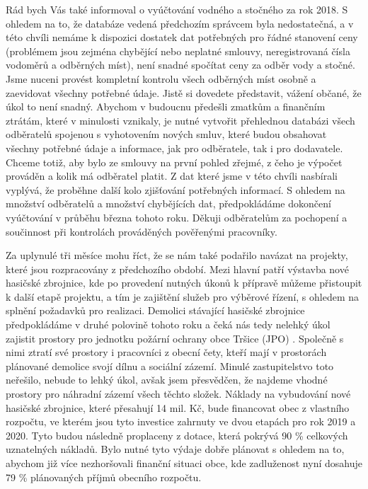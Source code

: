 \documentclass{article}
\begin{document}
\begin{multicols}{3}
{Rád bych Vás také informoval o vyúčtování vodného a stočného za rok 2018. S ohledem na to, že databáze vedená předchozím správcem byla nedostatečná, a v této chvíli nemáme k dispozici dostatek dat potřebných pro řádné stanovení ceny (problémem jsou zejména chybějící nebo neplatné smlouvy, neregistrovaná čísla vodoměrů a odběrných míst), není snadné spočítat ceny za odběr vody a stočné. Jsme nuceni provést kompletní kontrolu všech odběrných míst osobně a zaevidovat všechny potřebné údaje. Jistě si dovedete představit, vážení občané, že úkol to není snadný. Abychom v budoucnu předešli zmatkům a finančním ztrátám, které v minulosti vznikaly, je nutné vytvořit přehlednou databázi všech odběratelů spojenou s vyhotovením nových smluv, které budou obsahovat všechny potřebné údaje a informace, jak pro odběratele, tak i pro dodavatele. Chceme totiž, aby bylo ze smlouvy na první pohled zřejmé, z čeho je výpočet prováděn a kolik má odběratel platit. Z dat které jsme v této chvíli nasbírali vyplývá, že proběhne další kolo zjišťování potřebných informací. S ohledem na množství odběratelů a množství chybějících dat, předpokládáme dokončení vyúčtování v průběhu března tohoto roku. Děkuji odběratelům za pochopení a součinnost při kontrolách prováděných pověřenými pracovníky.

Za uplynulé tři měsíce mohu říct, že se nám také podařilo navázat na projekty, které jsou rozpracovány z předchozího období. Mezi hlavní patří výstavba nové hasičské zbrojnice, kde po provedení nutných úkonů k přípravě můžeme přistoupit k další etapě projektu, a tím je zajištění služeb pro výběrové řízení, s ohledem na splnění požadavků pro realizaci. Demolici stávající hasičské zbrojnice předpokládáme v druhé polovině tohoto roku a čeká nás tedy nelehký úkol zajistit prostory pro jednotku požární ochrany obce Tršice (JPO) . Společně s nimi ztratí své prostory i pracovníci z obecní čety, kteří mají v prostorách plánované demolice svojí dílnu a sociální zázemí. Minulé zastupitelstvo toto neřešilo, nebude to lehký úkol, avšak jsem přesvědčen, že najdeme vhodné prostory pro náhradní zázemí všech těchto složek. Náklady na vybudování nové hasičské zbrojnice, které přesahují 14 mil. Kč, bude financovat obec z vlastního rozpočtu, ve kterém jsou tyto investice zahrnuty ve dvou etapách pro rok 2019 a 2020. Tyto budou následně proplaceny z dotace, která pokrývá 90 \% celkových uznatelných nákladů. Bylo nutné tyto výdaje dobře plánovat s ohledem na to, abychom již více nezhoršovali finanční situaci obce, kde zadluženost nyní dosahuje 79 \% plánovaných příjmů obecního rozpočtu.

}
\end{multicols}
\end{document}
